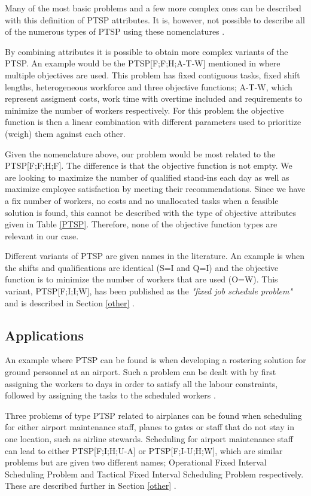 Many of the most basic problems and a few more complex ones can be described with this definition of PTSP attributes. It is, however, not possible to describe all of the numerous types of PTSP using these nomenclatures \citet{krishnamoorthy_2001}.

By combining attributes it is possible to obtain more complex variants of the PTSP. An example would be the PTSP[F;F;H;A-T-W] mentioned in \citet{krishnamoorthy_2001} where multiple objectives are used. This problem has fixed contiguous tasks, fixed shift lengths, heterogeneous workforce and three objective functions; A-T-W, which represent assigment costs, work time with overtime included and requirements to minimize the number of workers respectively. For this problem the objective function is then a linear combination with different parameters used to prioritize (weigh) them against each other.

Given the nomenclature above, our problem would be most related to the PTSP[F;F;H;F]. The difference is that the objective function is not empty. We are looking to maximize the number of qualified stand-ins each day as well as maximize employee satisfaction by meeting their recommendations. Since we have a fix number of workers, no costs and no unallocated tasks when a feasible solution is found, this cannot be described with the type of objective attributes given in Table \ref{PTSP}. Therefore, none of the objective function types are relevant in our case.

Different variants of PTSP are given names in the literature. An example is when the shifts and qualifications are identical (S=I and Q=I) and the objective function is to minimize the number of workers that are used (O=W). This variant, PTSP[F;I;I;W], has been published as the \textit{"fixed job schedule problem"} and is described in Section \ref{other} \citet{krishnamoorthy_2001}.

\subsection{Applications}
An example where PTSP can be found is when developing a rostering solution for ground personnel at an airport. Such a problem can be dealt with by first assigning the workers to days in order to satisfy all the labour constraints, followed by assigning the tasks to the scheduled workers \citet{krishnamoorthy_2001}.

Three problems of type PTSP related to airplanes can be found when scheduling for either airport maintenance staff, planes to gates or staff that do not stay in one location, such as airline stewards. Scheduling for airport maintenance staff can lead to either PTSP[F;I;H;U-A] or PTSP[F;I-U;H;W], which are similar problems but are given two different names; Operational Fixed Interval Scheduling Problem and Tactical Fixed Interval Scheduling Problem respectively. These are described further in Section \ref{other} \citet{krishnamoorthy_2001}. 

